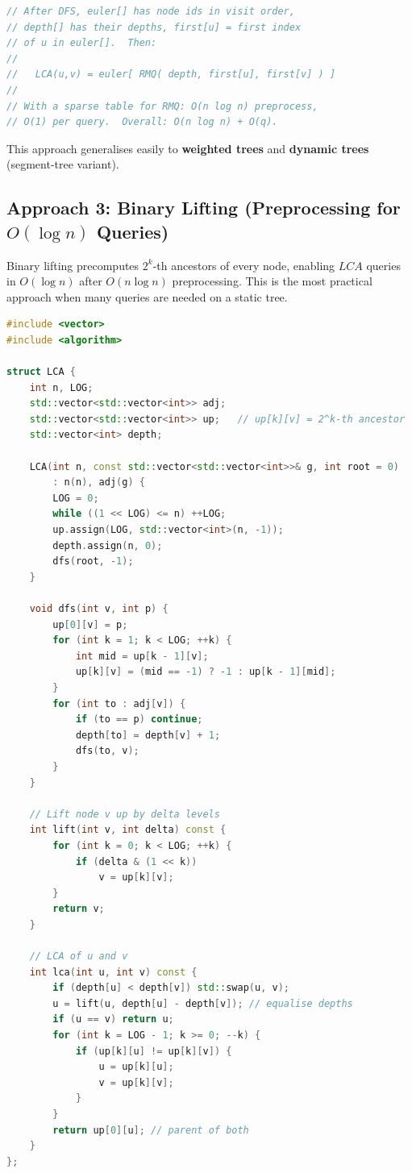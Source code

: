 \begin{lstlisting}[language=C++]
// After DFS, euler[] has node ids in visit order,
// depth[] has their depths, first[u] = first index
// of u in euler[].  Then:
//
//   LCA(u,v) = euler[ RMQ( depth, first[u], first[v] ) ]
//
// With a sparse table for RMQ: O(n log n) preprocess,
// O(1) per query.  Overall: O(n log n) + O(q).
\end{lstlisting}

This approach generalises easily to \textbf{weighted trees} and
\textbf{dynamic trees} (segment-tree variant).

\subsection{Approach 3: Binary Lifting (Preprocessing for \texorpdfstring{$O(\log n)$}{O(log n)} Queries)}

Binary lifting precomputes $2^k$-th ancestors of every node, enabling
$LCA$ queries in $O(\log n)$ after $O(n \log n)$ preprocessing.
This is the most practical approach when many queries are needed on
a static tree.

\begin{lstlisting}[language=C++]
#include <vector>
#include <algorithm>

struct LCA {
    int n, LOG;
    std::vector<std::vector<int>> adj;
    std::vector<std::vector<int>> up;   // up[k][v] = 2^k-th ancestor
    std::vector<int> depth;

    LCA(int n, const std::vector<std::vector<int>>& g, int root = 0)
        : n(n), adj(g) {
        LOG = 0;
        while ((1 << LOG) <= n) ++LOG;
        up.assign(LOG, std::vector<int>(n, -1));
        depth.assign(n, 0);
        dfs(root, -1);
    }

    void dfs(int v, int p) {
        up[0][v] = p;
        for (int k = 1; k < LOG; ++k) {
            int mid = up[k - 1][v];
            up[k][v] = (mid == -1) ? -1 : up[k - 1][mid];
        }
        for (int to : adj[v]) {
            if (to == p) continue;
            depth[to] = depth[v] + 1;
            dfs(to, v);
        }
    }

    // Lift node v up by delta levels
    int lift(int v, int delta) const {
        for (int k = 0; k < LOG; ++k) {
            if (delta & (1 << k))
                v = up[k][v];
        }
        return v;
    }

    // LCA of u and v
    int lca(int u, int v) const {
        if (depth[u] < depth[v]) std::swap(u, v);
        u = lift(u, depth[u] - depth[v]); // equalise depths
        if (u == v) return u;
        for (int k = LOG - 1; k >= 0; --k) {
            if (up[k][u] != up[k][v]) {
                u = up[k][u];
                v = up[k][v];
            }
        }
        return up[0][u]; // parent of both
    }
};
\end{lstlisting}

